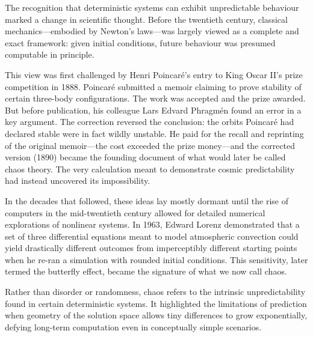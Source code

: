 \begin{historical}
The recognition that deterministic systems can exhibit unpredictable behaviour marked a change in scientific thought. Before the twentieth century, classical mechanics—embodied by Newton’s laws—was largely viewed as a complete and exact framework: given initial conditions, future behaviour was presumed computable in principle. 

This view was first challenged by Henri Poincaré’s entry to King Oscar II’s prize competition in 1888. Poincaré submitted a memoir claiming to prove stability of certain three-body configurations. The work was accepted and the prize awarded. But before publication, his colleague Lars Edvard Phragmén found an error in a key argument. The correction reversed the conclusion: the orbits Poincaré had declared stable were in fact wildly unstable. He paid for the recall and reprinting of the original memoir—the cost exceeded the prize money—and the corrected version (1890) became the founding document of what would later be called chaos theory. The very calculation meant to demonstrate cosmic predictability had instead uncovered its impossibility.

In the decades that followed, these ideas lay mostly dormant until the rise of computers in the mid-twentieth century allowed for detailed numerical explorations of nonlinear systems. In 1963, Edward Lorenz demonstrated that a set of three differential equations meant to model atmospheric convection could yield drastically different outcomes from imperceptibly different starting points when he re-ran a simulation with rounded initial conditions. This sensitivity, later termed the \QSOpen{}butterfly effect,\QSClose{} became the signature of what we now call chaos. 

Rather than disorder or randomness, chaos refers to the intrinsic unpredictability found in certain deterministic systems. It highlighted the limitations of prediction when geometry of the solution space allows tiny differences to grow exponentially, defying long-term computation even in conceptually simple scenarios.
\end{historical}
